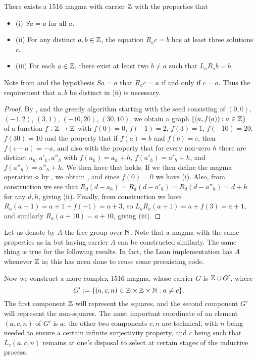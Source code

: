 \begin{corollary}\label{1516-base} There exists a 1516 magma with carrier $\mathbb{Z}$ with the properties that
  \begin{itemize}
    \item (i) $Sa=a$ for all $a$.
    \item (ii) For any distinct $a,b \in \mathbb{Z}$, the equation $R_a c = b$ has at least three solutions $c$.
    \item (iii) For each $a \in \mathbb{Z}$, there exist at least two $b \neq a$ such that $L_a R_a b = b$.
  \end{itemize}
\end{corollary}


Note from  and the hypothesis $Sa=a$ that $R_a c = a$ if and only if $c=a$.  Thus the requirement that $a,b$ be distinct in (ii) is necessary.

\begin{proof}  By ,  and the greedy algorithm starting with the seed consisting of $(0,0)$, $(-1,2)$, $(3,1)$, $(-10,20)$, $(30,10)$, we obtain a graph $\{ (a,f(a)): a \in \mathbb{Z} \}$ of a function $f:\mathbb{Z} \to \mathbb{Z}$ with $f(0)=0$, $f(-1)=2$, $f(3)=1$, $f(-10) = 20$, $f(30)=10$ and the property that if $f(a)=b$ and $f(b)=c$, then $f(c-a)=-a$, and also with the property that for every non-zero $h$ there are distinct $a_h, a'_h, a''_h$ with $f(a_h)=a_h+h$, $f(a'_h) = a'_h+h$, and $f(a''_h) = a''_h+h$.  We then have that  holds.  If we then define the magma operation $\diamond$ by , we obtain , and since $f(0)=0$ we have (i).  Also, from construction we see that $R_d (d - a_h) = R_d (d - a'_h) = R_d (d - a''_h) = d+h$ for any $d,h$, giving (ii).  Finally, from construction we have $R_a (a+1) = a+1+f(-1) = a+3$, so $L_a R_a (a+1) = a + f(3) = a+1$, and similarly $R_a (a+10) = a+10$, giving (iii).
\end{proof}

Let us denote by $A$ the free group over $\mathbb{N}$. Note that a magma with the same properties as in  but having carrier $A$ can be constructed similarly.
The same thing is true for the following results. In fact, the Lean implementation has $A$ whenever $\mathbb{Z}$ is; this has neen done to reuse some preexisting code.

Now we construct a more complex 1516 magma, whose carrier $G$ is $\mathbb{Z} \cup G'$, where
$$G' := \{ (a,c,n) \in \mathbb{Z} \times \mathbb{Z} \times \mathbb{N} : a \neq c\}.$$
The first component $\mathbb{Z}$ will represent the squares, and the second component $G'$ will represent the non-squares.  The most important coordinate of an element $(a,c,n)$ of $G'$ is $a$; the other two components $c,n$ are technical, with $n$ being needed to ensure a certain infinite surjectivity property, and $c$ being such that $L_c (a,c,n)$ remains at one's disposal to select at certain stages of the inductive process.

